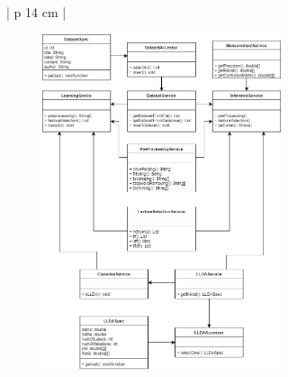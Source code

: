 \begin{table}[H]
\begin{adjustbox}{width=1\textwidth}
\begin{tabular}{| p {14 cm} |}
\hline
\begin{figure}[H]
	\centering
	\includegraphics[width=7cm]{images/ClassDiagram}
\end{figure}\\
\hline
\end{tabular}
\end{adjustbox}
\end{table}

\newpage